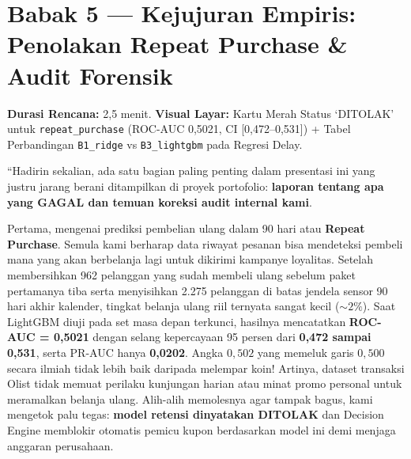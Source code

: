 \documentclass[11pt,a4paper,oneside]{book}
\newcommand{\code}[1]{{\small\nolinkurl{#1}}}
\begin{document}
\section{Babak 5 --- Kejujuran Empiris: Penolakan Repeat Purchase \& Audit Forensik}

\begin{stagebox}
\textbf{Durasi Rencana:} 2,5 menit. \quad \textbf{Visual Layar:} Kartu Merah Status `DITOLAK' untuk \code{repeat_purchase} (ROC-AUC 0,5021, CI [0,472--0,531]) + Tabel Perbandingan \code{B1_ridge} vs \code{B3_lightgbm} pada Regresi Delay.
\end{stagebox}

\begin{scriptbox}
``Hadirin sekalian, ada satu bagian paling penting dalam presentasi ini yang justru jarang berani ditampilkan di proyek portofolio: \textbf{laporan tentang apa yang GAGAL dan temuan koreksi audit internal kami}.

Pertama, mengenai prediksi pembelian ulang dalam 90 hari atau \textbf{Repeat Purchase}. Semula kami berharap data riwayat pesanan bisa mendeteksi pembeli mana yang akan berbelanja lagi untuk dikirimi kampanye loyalitas. Setelah membersihkan 962 pelanggan yang sudah membeli ulang sebelum paket pertamanya tiba serta menyisihkan 2.275 pelanggan di batas jendela sensor 90 hari akhir kalender, tingkat belanja ulang riil ternyata sangat kecil ($\sim 2\%$). Saat LightGBM diuji pada set masa depan terkunci, hasilnya mencatatkan \textbf{ROC-AUC = 0,5021} dengan selang kepercayaan 95 persen dari \textbf{0,472 sampai 0,531}, serta PR-AUC hanya \textbf{0,0202}. Angka $0{,}502$ yang memeluk garis $0{,}500$ secara ilmiah tidak lebih baik daripada melempar koin! Artinya, dataset transaksi Olist tidak memuat perilaku kunjungan harian atau minat promo personal untuk meramalkan belanja ulang. Alih-alih memolesnya agar tampak bagus, kami mengetok palu tegas: \textbf{model retensi dinyatakan DITOLAK} dan Decision Engine memblokir otomatis pemicu kupon berdasarkan model ini demi menjaga anggaran perusahaan.


\end{scriptbox}
\end{document}
